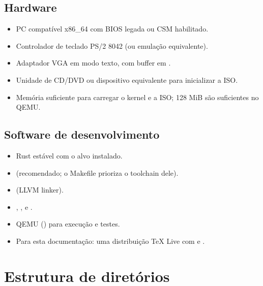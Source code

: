 \subsection{Hardware}

\begin{itemize}
  \item PC compat\'ivel x86\_64 com BIOS legada ou CSM habilitado.
  \item Controlador de teclado PS/2 8042 (ou emula\c{c}\~ao equivalente).
  \item Adaptador VGA em modo texto, com buffer em .
  \item Unidade de CD/DVD ou dispositivo equivalente para inicializar a ISO.
  \item Mem\'oria suficiente para carregar o kernel e a ISO; 128 MiB s\~ao
        suficientes no QEMU.
\end{itemize}

\subsection{Software de desenvolvimento}

\begin{itemize}
  \item Rust est\'avel com o alvo  instalado.
  \item {} (recomendado; o Makefile prioriza o toolchain dele).
  \item {} (LLVM linker).
  \item {}, ,  e
        .
  \item QEMU () para execu\c{c}\~ao e testes.
  \item Para esta documenta\c{c}\~ao: uma distribui\c{c}\~ao TeX Live com
         e .
\end{itemize}

\section{Estrutura de diret\'orios}

